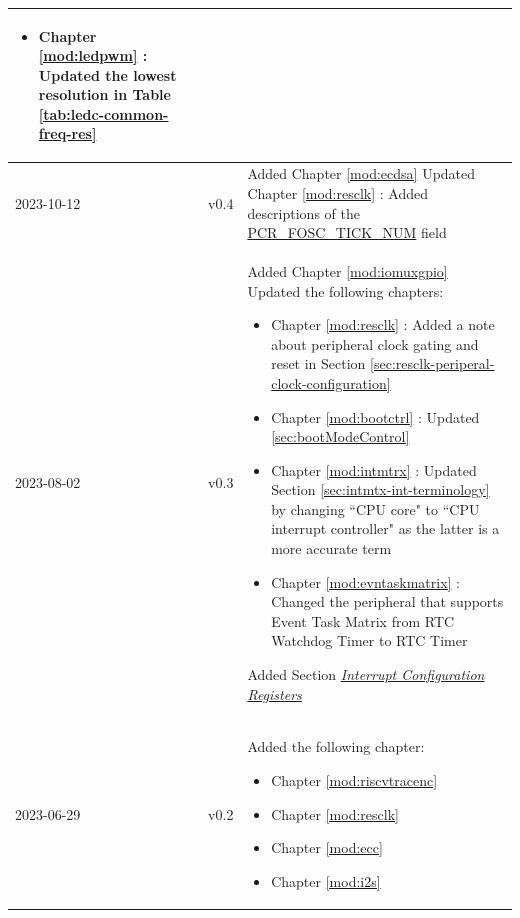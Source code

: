 \begin{longtable}[l]{ | m{2cm} | m{1.5cm} | m{12cm} | }
\begin{itemize}
        \item Chapter \ref{mod:ledpwm} \textit{\nameref{mod:ledpwm}}: Updated the lowest resolution in Table \ref{tab:ledc-common-freq-res}  %
    \end{itemize}
    \\\hline
    2023-10-12 & v0.4 &
    Added Chapter \ref{mod:ecdsa} \textit{\nameref{mod:ecdsa}}  \newline
    Updated Chapter \ref{mod:resclk} \textit{\nameref{mod:resclk}}: Added descriptions of the \hyperref[fielddesc:PCRFOSCTICKNUM]{PCR\_FOSC\_TICK\_NUM} field
    \\\hline
    2023-08-02             & v0.3 &
    Added Chapter \ref{mod:iomuxgpio} \textit{\nameref{mod:iomuxgpio}}  \newline
    Updated the following chapters:
    \begin{itemize}
        \item Chapter \ref{mod:resclk} \textit{\nameref{mod:resclk}}: Added a note about peripheral clock gating and reset in Section \ref{sec:resclk-periperal-clock-configuration} %
        \item Chapter \ref{mod:bootctrl} \textit{\nameref{mod:bootctrl}}: Updated \ref{sec:bootModeControl} \textit{\nameref{sec:bootModeControl}}  %
        \item Chapter \ref{mod:intmtrx} \textit{\nameref{mod:intmtrx}}: Updated Section \ref{sec:intmtx-int-terminology} \textit{\nameref{sec:intmtx-int-terminology}} by changing ``CPU core" to ``CPU interrupt controller" as the latter is a more accurate term %
        \item Chapter \ref{mod:evntaskmatrix} \textit{\nameref{mod:evntaskmatrix}}: Changed the peripheral that supports Event Task Matrix from RTC Watchdog Timer to RTC Timer %
    \end{itemize}
    Added Section \hyperref[interrupt-config-registers]{\textit{Interrupt Configuration Registers}}
    \\\hline
    2023-06-29          & v0.2 &
    Added the following chapter:
    \begin{itemize}
        \item Chapter \ref{mod:riscvtracenc} \textit{\nameref{mod:riscvtracenc}}
        \item Chapter \ref{mod:resclk} \textit{\nameref{mod:resclk}}
        \item Chapter \ref{mod:ecc} \textit{\nameref{mod:ecc}}
        \item Chapter \ref{mod:i2s} \textit{\nameref{mod:i2s}}

\end{itemize}
\end{longtable}

